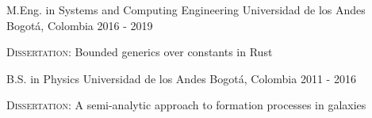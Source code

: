 

\begin{cventries}

\vspace{-1cm}
\cventry{}{}{}{}{}
\noindent
\cventry
{M.Eng. in Systems and Computing Engineering} %
{Universidad de los Andes} %
{Bogotá, Colombia} %
{2016 - 2019} %
{
    \begin{cvitems}
    \item {\textsc{Dissertation:} Bounded generics over constants in Rust}
    \end{cvitems}
}
\vspace{0.4cm}
\cventry
{B.S. in Physics} %
{Universidad de los Andes} %
{Bogotá, Colombia} %
{2011 - 2016} %
{
    \begin{cvitems}
    \item {\textsc{Dissertation:} A semi-analytic approach to formation processes in galaxies}
    \end{cvitems}
}

\vspace{-0.5cm}
\end{cventries}
